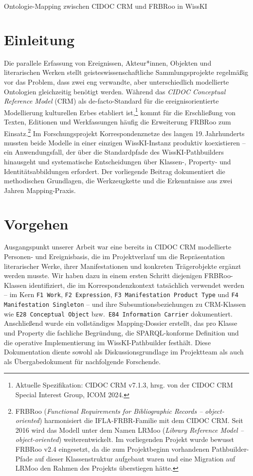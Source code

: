 \begin{beitrag}{Ontologie-Mapping zwischen CIDOC CRM und FRBRoo in WissKI}
\section{Einleitung}
Die parallele Erfassung von Ereignissen, Akteur*innen, Objekten und literarischen Werken stellt geisteswissenschaftliche Sammlungsprojekte regelmäßig vor das Problem, dass zwei eng verwandte, aber unterschiedlich modellierte Ontologien gleichzeitig benötigt werden. Während das \emph{CIDOC Conceptual Reference Model} (CRM) als de-facto-Standard für die ereignisorientierte Modellierung kulturellen Erbes etabliert ist,\footnote{Aktuelle Spezifikation: CIDOC CRM v7.1.3, hrsg. von der CIDOC CRM Special Interest Group, ICOM 2024.} kommt für die Erschließung von Texten, Editionen und Werkfassungen häufig die Erweiterung FRBRoo zum Einsatz.\footnote{FRBRoo (\emph{Functional Requirements for Bibliographic Records -- object-oriented}) harmonisiert die IFLA-FRBR-Familie mit dem CIDOC CRM.
Seit 2016 wird das Modell unter dem Namen LRMoo (\emph{Library Reference Model -- object-oriented}) weiterentwickelt.
Im vorliegenden Projekt wurde bewusst FRBRoo v2.4 eingesetzt, da die zum Projektbeginn vorhandenen Pathbuilder-Pfade auf dieser Klassenstruktur aufgebaut waren und eine Migration auf LRMoo den Rahmen des Projekts überstiegen hätte.} Im Forschungsprojekt \glqq Korrespondenznetze des langen 19.\,Jahrhunderts\grqq{} mussten beide Modelle in einer einzigen WissKI-Instanz produktiv koexistieren -- ein Anwendungsfall, der über die Standardpfade des WissKI-Pathbuilders hinausgeht und systematische Entscheidungen über Klassen-, Property- und Identitätsabbildungen erfordert. Der vorliegende Beitrag dokumentiert die methodischen Grundlagen, die Werkzeugkette und die Erkenntnisse aus zwei Jahren Mapping-Praxis.

\section{Vorgehen}
Ausgangspunkt unserer Arbeit war eine bereits in CIDOC CRM modellierte Personen- und Ereignisbasis, die im Projektverlauf um die Repräsentation literarischer Werke, ihrer Manifestationen und konkreten Trägerobjekte ergänzt werden musste. Wir haben dazu in einem ersten Schritt diejenigen FRBRoo-Klassen identifiziert, die im Korrespondenzkontext tatsächlich verwendet werden -- im Kern \texttt{F1 Work}, \texttt{F2 Expression}, \texttt{F3 Manifestation Product Type} und \texttt{F4 Manifestation Singleton} -- und ihre Subsumtionsbeziehungen zu CRM-Klassen wie \texttt{E28 Conceptual Object} bzw.\ \texttt{E84 Information Carrier} dokumentiert. Anschließend wurde ein vollständiges Mapping-Dossier erstellt, das pro Klasse und Property die fachliche Begründung, die SPARQL-konforme Definition und die operative Implementierung im WissKI-Pathbuilder festhält. Diese Dokumentation diente sowohl als Diskussionsgrundlage im Projektteam als auch als Übergabedokument für nachfolgende Forschende.


\end{beitrag}
